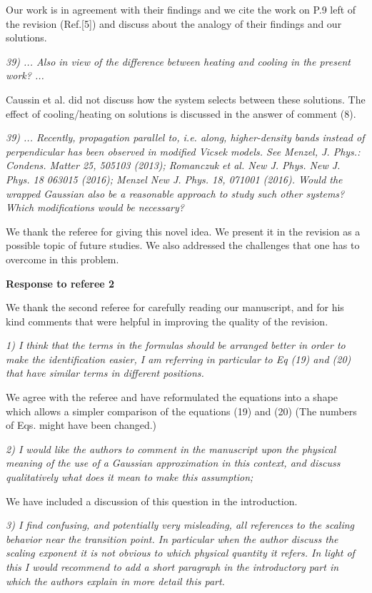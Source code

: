 \documentclass[a4paper,11pt]{letter}
\newcommand{\rf}[1]{\textit{\textcolor{hlcolor}{#1}}}
\begin{document}
Our work is in agreement with their findings and we cite the work on P.9 left of the revision (Ref.[5]) and discuss about the analogy of their findings and our solutions.

\rf{39) ... Also in view of the difference between heating and cooling in the present work? ...}

Caussin et al. did not discuss how the system selects between these solutions. The effect of cooling/heating on solutions is discussed in the answer of comment (8).

\rf{39) ... Recently, propagation parallel to, i.e. along, higher-density bands instead of perpendicular has been observed in modified Vicsek models. See Menzel, J. Phys.: Condens. Matter 25, 505103 (2013); Romanczuk et al. New J. Phys. New J. Phys. 18 063015 (2016); Menzel New J. Phys. 18, 071001 (2016). Would the wrapped Gaussian also be a reasonable approach to study such other systems? Which modifications would be necessary?}

We thank the referee for giving this novel idea. We present it in the revision as a possible topic of future studies. We also addressed the challenges that one has to overcome in this problem.




\pagebreak

{\Large \bf Response to referee 2}

We thank the second referee for carefully reading our manuscript, and for his kind comments that were helpful in improving the quality of the revision.

\rf{1) I think that the terms in the formulas should be arranged better in order to make the identification easier, I am referring in particular to Eq (19) and (20) that have similar terms in different positions.}

We agree with the referee and have reformulated the equations into a shape which allows a simpler comparison of the equations (19) and (20) (The numbers of Eqs. might have been changed.)

\rf{2) I would like the authors to comment in the manuscript upon the physical meaning of the use of a Gaussian approximation in this context, and discuss qualitatively what does it mean to make this assumption;}

We have included a discussion of this question in the introduction.

\rf{3) I find confusing, and potentially very misleading, all references to the scaling behavior near the transition point. In particular when the author discuss the scaling exponent it is not obvious to which physical quantity it refers. In light of this I would recommend to add a short paragraph in the introductory part in which the authors explain in more detail this part.}
\end{document}
